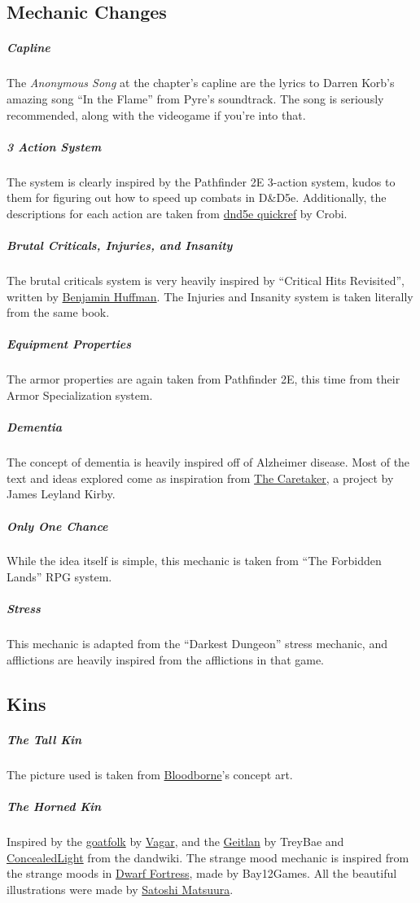 \subsection*{Mechanic Changes}
    \subparagraph{Capline} The \textit{Anonymous Song} at the chapter's capline are the lyrics to Darren Korb's amazing song ``In the Flame'' from Pyre's soundtrack.
    The song is seriously recommended, along with the videogame if you're into that.

    \subparagraph{3 Action System} The system is clearly inspired by the Pathfinder 2E 3-action system, kudos to them for figuring out how to speed up combats in D\&D5e.
    Additionally, the descriptions for each action are taken from \href{https://crobi.github.io/dnd5e-quickref/}{dnd5e quickref} by Crobi.

    \subparagraph{Brutal Criticals, Injuries, and Insanity} The brutal criticals system is very heavily inspired by ``Critical Hits Revisited'', written by \href{https://www.sterlingvermin.com/}{Benjamin Huffman}.
    The Injuries and Insanity system is taken literally from the same book.

    \subparagraph{Equipment Properties} The armor properties are again taken from Pathfinder 2E, this time from their Armor Specialization system.

    \subparagraph{Dementia} The concept of dementia is heavily inspired off of Alzheimer disease.
    Most of the text and ideas explored come as inspiration from \href{https://thecaretaker.bandcamp.com/}{The Caretaker}, a project by James Leyland Kirby.

    \subparagraph{Only One Chance} While the idea itself is simple, this mechanic is taken from ``The Forbidden Lands'' RPG system.

    \subparagraph{Stress} This mechanic is adapted from the ``Darkest Dungeon'' stress mechanic, and afflictions are heavily inspired from the afflictions in that game.

\subsection*{Kins}
    \subparagraph{The Tall Kin} The picture used is taken from \href{https://www.playstation.com/en-us/games/bloodborne-ps4/}{Bloodborne}'s concept art.

    \subparagraph{The Horned Kin} Inspired by the \href{https://homebrewery.naturalcrit.com/share/BksGVG27b}{goatfolk} by \href{https://www.reddit.com/user/Vagar/}{Vagar}, and the \href{https://www.dandwiki.com/wiki/Geitlan_(5e_Race)}{Geitlan} by TreyBae and \href{https://www.dandwiki.com/wiki/User:ConcealedLight}{ConcealedLight} from the dandwiki.
    The strange mood mechanic is inspired from the strange moods in \href{http://www.bay12games.com/dwarves/}{Dwarf Fortress}, made by Bay12Games.
    All the beautiful illustrations were made by \href{https://www.artstation.com/hiziripro}{Satoshi Matsuura}.

